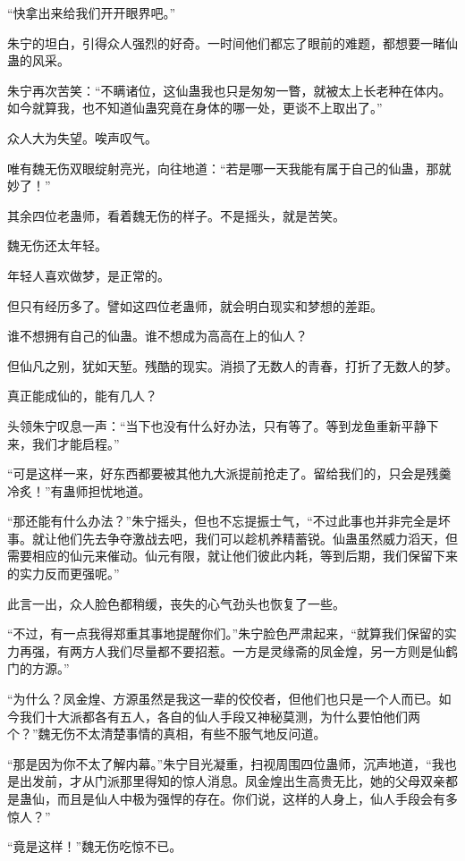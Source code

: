 \begin{this_body}
“快拿出来给我们开开眼界吧。”

朱宁的坦白，引得众人强烈的好奇。一时间他们都忘了眼前的难题，都想要一睹仙蛊的风采。

朱宁再次苦笑：“不瞒诸位，这仙蛊我也只是匆匆一瞥，就被太上长老种在体内。如今就算我，也不知道仙蛊究竟在身体的哪一处，更谈不上取出了。”

众人大为失望。唉声叹气。

唯有魏无伤双眼绽射亮光，向往地道：“若是哪一天我能有属于自己的仙蛊，那就妙了！”

其余四位老蛊师，看着魏无伤的样子。不是摇头，就是苦笑。

魏无伤还太年轻。

年轻人喜欢做梦，是正常的。

但只有经历多了。譬如这四位老蛊师，就会明白现实和梦想的差距。

谁不想拥有自己的仙蛊。谁不想成为高高在上的仙人？

但仙凡之别，犹如天堑。残酷的现实。消损了无数人的青春，打折了无数人的梦。

真正能成仙的，能有几人？

头领朱宁叹息一声：“当下也没有什么好办法，只有等了。等到龙鱼重新平静下来，我们才能启程。”

“可是这样一来，好东西都要被其他九大派提前抢走了。留给我们的，只会是残羹冷炙！”有蛊师担忧地道。

“那还能有什么办法？”朱宁摇头，但也不忘提振士气，“不过此事也并非完全是坏事。就让他们先去争夺激战去吧，我们可以趁机养精蓄锐。仙蛊虽然威力滔天，但需要相应的仙元来催动。仙元有限，就让他们彼此内耗，等到后期，我们保留下来的实力反而更强呢。”

此言一出，众人脸色都稍缓，丧失的心气劲头也恢复了一些。

“不过，有一点我得郑重其事地提醒你们。”朱宁脸色严肃起来，“就算我们保留的实力再强，有两方人我们尽量都不要招惹。一方是灵缘斋的凤金煌，另一方则是仙鹤门的方源。”

“为什么？凤金煌、方源虽然是我这一辈的佼佼者，但他们也只是一个人而已。如今我们十大派都各有五人，各自的仙人手段又神秘莫测，为什么要怕他们两个？”魏无伤不太清楚事情的真相，有些不服气地反问道。

“那是因为你不太了解内幕。”朱宁目光凝重，扫视周围四位蛊师，沉声地道，“我也是出发前，才从门派那里得知的惊人消息。凤金煌出生高贵无比，她的父母双亲都是蛊仙，而且是仙人中极为强悍的存在。你们说，这样的人身上，仙人手段会有多惊人？”

“竟是这样！”魏无伤吃惊不已。


\end{this_body}
